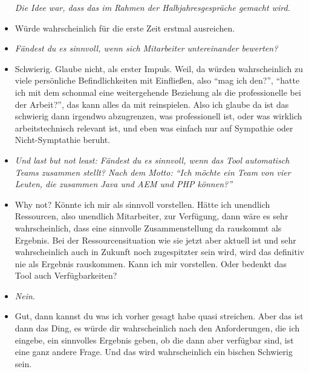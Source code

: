\begin{itemize}
\textit{Die Idee war, dass das im Rahmen der Halbjahresgespräche gemacht wird.}
\item[] Würde wahrscheinlich für die erste Zeit erstmal ausreichen.

\item[] \textit{Fändest du es sinnvoll, wenn sich Mitarbeiter untereinander bewerten?}
\item[] Schwierig. Glaube nicht, als erster Impuls. Weil, da würden wahrscheinlich zu viele persönliche Befindlichkeiten mit Einfließen, also “mag ich den?”, “hatte ich mit dem schonmal eine weitergehende Beziehung als die professionelle bei der Arbeit?”, das kann alles da mit reinspielen. Also ich glaube da ist das schwierig dann irgendwo abzugrenzen, was professionell ist, oder was wirklich arbeitstechnisch relevant ist, und eben was einfach nur auf Sympathie oder Nicht-Symptathie beruht.

\item[] \textit{Und last but not least: Fändest du es sinnvoll, wenn das Tool automatisch Teams zusammen stellt? Nach dem Motto: “Ich möchte ein Team von vier Leuten, die zusammen Java und AEM und PHP können?”}
\item[] Why not? Könnte ich mir als sinnvoll vorstellen. Hätte ich unendlich Ressourcen, also unendlich Mitarbeiter, zur Verfügung, dann wäre es sehr wahrscheinlich, dass eine sinnvolle Zusammenstellung da rauskommt als Ergebnis. Bei der Ressourcensituation wie sie jetzt aber aktuell ist und sehr wahrscheinlich auch in Zukunft noch zugespitzter sein wird, wird das definitiv nie als Ergebnis rauskommen. Kann ich mir vorstellen. Oder bedenkt das Tool auch Verfügbarkeiten?

\item[] \textit{Nein.}
\item[] Gut, dann kannst du was ich vorher gesagt habe quasi streichen. Aber das ist dann das Ding, es würde dir wahrscheinlich nach den Anforderungen, die ich eingebe, ein sinnvolles Ergebnis geben, ob die dann aber verfügbar sind, ist eine ganz andere Frage. Und das wird wahrscheinlich ein bischen Schwierig sein.
\end{itemize}

\newpage


